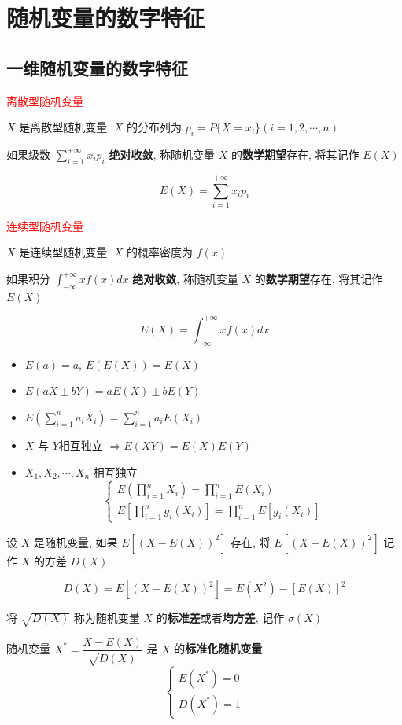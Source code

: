 \chapter{随机变量的数字特征}
\section{一维随机变量的数字特征}

\begin{definition}[数学期望]
	\textcolor{red}{离散型随机变量}

	$X$ 是离散型随机变量, $X$ 的分布列为 $p_{i} = P\{X = x_{i}\}(i = 1, 2, \cdots, n)$
	
	如果级数 $\sum\limits_{i = 1}^{+\infty} x_{i}p_{i}$ \textbf{绝对收敛}, 称随机变量 $X$ 的\textbf{数学期望}存在, 将其记作 $E(X)$
	
	$$E(X) = \sum\limits_{i = 1}^{+\infty}x_{i}p_{i}$$
	
	\textcolor{red}{连续型随机变量}

	$X$ 是连续型随机变量, $X$ 的概率密度为 $f(x)$
	
	如果积分 $\int_{-\infty}^{+\infty}xf(x)dx$ \textbf{绝对收敛}, 称随机变量 $X$ 的\textbf{数学期望}存在, 将其记作 $E(X)$
	
	$$E(X) = \int_{-\infty}^{+\infty}xf(x)dx$$
\end{definition}
\begin{corollary}[数学期望推论]
	\begin{itemize}
		\item $E(a) = a$, $E(E(X)) = E(X)$
		\item $E(aX \pm bY) = aE(X) \pm bE(Y)$
		\item $E\left(\sum\limits_{i = 1}^{n}a_{i}X_{i}\right) = \sum\limits_{i = 1}^{n}a_{i}E(X_{i})$
		\item $X$ 与 $Y$相互独立 $\Rightarrow E(XY) = E(X)E(Y)$ 
		\item $X_{1}, X_{2}, \cdots, X_{n}$ 相互独立
		$$\begin{cases}
			E\left(\prod\limits_{i = 1}^{n}X_{i}\right) = \prod\limits_{i = 1}^{n}E(X_{i})\\
			E\left[\prod\limits_{i = 1}^{n}g_{i}(X_{i})\right] = \prod\limits_{i = 1}^{n}E\left[g_{i}(X_{i})\right]
		\end{cases}$$
	\end{itemize}
\end{corollary}


\begin{definition}[方差和标准差]
	设 $X$ 是随机变量, 如果 $E[(X-E(X))^{2}]$ 存在, 将 $E[(X-E(X))^{2}]$ 记作 $X$ 的方差 $D(X)$ 
	
	$$D(X) = E[(X-E(X))^{2}] = E(X^{2})-[E(X)]^2$$
	
	将 $\sqrt{D(X)}$ 称为随机变量 $X$ 的\textbf{标准差}或者\textbf{均方差}, 记作 $\sigma(X)$

	随机变量 $X^{*} = \dfrac{X - E(X)}{\sqrt{D(X)}}$ 是 $X$ 的\textbf{标准化随机变量}
	$$\begin{cases}
		E(X^{*}) = 0\\
		D(X^{*}) = 1
	\end{cases}$$
	
\end{definition}

